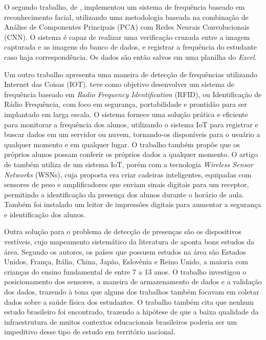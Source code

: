 O segundo trabalho, de , implementou um sistema de frequência baseado em reconhecimento facial, utilizando uma metodologia baseada na combinação de Análise de Componentes Principais (PCA) com Redes Neurais Convolucionais (CNN). O sistema é capaz de realizar uma verificação cruzada entre a imagem capturada e as imagens do banco de dados, e registrar a frequência do estudante caso haja correspondência. Os dados são então salvos em uma planilha do \textit{Excel}.

Um outro trabalho apresenta uma maneira de detecção de frequências utilizando Internet das Coisas (IOT).  teve como objetivo desenvolver um sistema de frequência baseado em \textit{Radio Frequency Identification} (RFID), ou Identificação de Rádio Frequência, com foco em segurança, portabilidade e prontidão para ser implantado em larga escala. O sistema fornece uma solução prática e eficiente para monitorar a frequência dos alunos, utilizando o sistema IoT para registrar e buscar dados em um servidor ou nuvem, tornando-os disponíveis para o usuário a qualquer momento e em qualquer lugar. O trabalho também propõe que os próprios alunos possam conferir os próprios dados a qualquer momento. O artigo de  também utiliza de um sistema IoT, porém com a tecnologia \textit{Wireless Sensor Networks} (WSNs), cuja proposta era criar cadeiras inteligentes, equipadas com sensores de peso e amplificadores que enviam sinais digitais para um receptor, permitindo a identificação da presença dos alunos durante o horário de aula. Também foi instalado um leitor de impressões digitais para aumentar a segurança e identificação dos alunos.

Outra solução para o problema de detecção de presenças são os dispositivos vestíveis, cujo mapeamento sistemático da literatura de  aponta bons estudos da área. Segundo os autores, os países que possuem estudos na área são Estados Unidos, França, Itália, China, Japão, Eslovênia e Reino Unido, a maioria com crianças do ensino fundamental de entre 7 a 13 anos. O trabalho investigou o posicionamento dos sensores, a maneira de armazenamento de dados e a validação dos dados, trazendo à tona que alguns dos trabalhos também focavam em coletar dados sobre a saúde física dos estudantes. O trabalho também cita que nenhum estudo brasileiro foi encontrado, trazendo a hipótese de que a baixa qualidade da infraestrutura de muitos contextos educacionais brasileiros poderia ser um impeditivo desse tipo de estudo em território nacional. 

